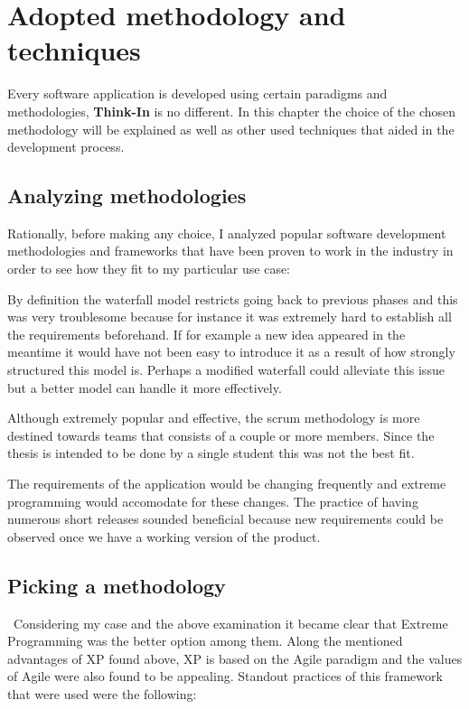 \chapter{Adopted methodology and techniques}

Every software application is developed using certain paradigms and methodologies, \textbf{Think-In} is no different. In this chapter the choice of the chosen methodology will be explained as well as other used techniques that aided in the development process.

\section{Analyzing methodologies}
Rationally, before making any choice, I analyzed popular software development methodologies and frameworks that have been proven to work in the industry in order to see how they fit to my particular use case:

\begin{description}[style=unboxed, labelwidth=\linewidth]
	\item[Waterfall]
	By definition the waterfall model restricts going back to previous phases and this was very troublesome because for instance it was extremely hard to establish all the requirements beforehand. If for example a new idea appeared in the meantime it would have not been easy to introduce it as a result of how strongly structured this model is. Perhaps a modified waterfall could alleviate this issue but a better model can handle it more effectively.
    \item[Scrum]
	Although extremely popular and effective, the scrum methodology is more destined towards teams that consists of a couple or more members. Since the thesis is intended to be done by a single student this was not the best fit.
	\item[Extreme Programming (XP)]
	The requirements of the application would be changing frequently and extreme programming would accomodate for these changes. The practice of having numerous short releases sounded beneficial because new requirements could be observed once we have a working version of the product.
\end{description}

\section{Picking a methodology}

\
Considering my case and the above examination it became clear that Extreme Programming was the better option among them. Along the mentioned advantages of XP found above, XP is based on the Agile paradigm and the values of Agile were also found to be appealing. Standout practices of this framework that were used were the following:

